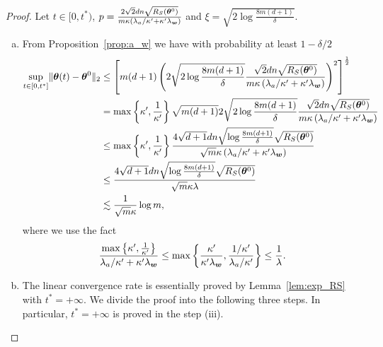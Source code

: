 \documentclass{article}
\begin{document}
\begin{proof}
    Let $t\in[0,t^*)$, $p=\frac{2\sqrt{2}dn\sqrt{R_S(\bm{\theta}^0)}}{m\kappa\left(\lambda_a/\kappa'+\kappa'\lambda_{\bm{w}}\right)}$ and $\xi=\sqrt{2\log\frac{8m(d+1)}{\delta}}$.
    \begin{enumerate}[(a)]
        \item From Proposition~\ref{prop:a_w} we have with probability at least $1-\delta/2$
              \begin{equation}
                  \begin{aligned}
                      \sup\limits_{t\in[0,t^*]}\lVert\bm{\theta}(t)-\bm{\theta}^0\rVert_2
                       & \leq \left[m(d+1)\left(2\sqrt{2\log\frac{8m(d+1)}{\delta}}\frac{\sqrt{2}dn\sqrt{R_S(\bm{\theta}^0)}}{m\kappa\left(\lambda_a/\kappa'+\kappa'\lambda_{\bm{w}}\right)}\right)^2\right]^{\frac{1}{2}}      \\
                       & =\max\left\{\kappa',\frac{1}{\kappa'}\right\}\sqrt{m(d+1)}2\sqrt{2\log\frac{8m(d+1)}{\delta}}\frac{\sqrt{2}dn\sqrt{R_S(\bm{\theta}^0)}}{m\kappa\left(\lambda_a/\kappa'+\kappa'\lambda_{\bm{w}}\right)} \\
                       & \leq\max\left\{\kappa',\frac{1}{\kappa'}\right\}\frac{4\sqrt{d+1}dn\sqrt{\log\frac{8m(d+1)}{\delta}}\sqrt{R_S(\bm{\theta}^0)}}{\sqrt{m}\kappa\left(\lambda_a/\kappa'+\kappa'\lambda_{\bm{w}}\right)}   \\
                       & \leq\frac{4\sqrt{d+1}dn\sqrt{\log\frac{8m(d+1)}{\delta}}\sqrt{R_S(\bm{\theta}^0)}}{\sqrt{m}\kappa\lambda}                                                                                           \\
                       & \lesssim \frac{1}{\sqrt{m}\kappa}\log m,
                  \end{aligned}
              \end{equation}
              where we use the fact
              \begin{equation}
                  \frac{\max\left\{\kappa',\frac{1}{\kappa'}\right\}}{\lambda_a/\kappa'+\kappa'\lambda_{\bm{w}}}\leq\max\left\{\frac{\kappa'}{\kappa'\lambda_{\bm{w}}},\frac{1/\kappa'}{\lambda_a/\kappa'}\right\}\leq\frac{1}{\lambda}.
              \end{equation}
        \item The linear convergence rate is essentially proved by Lemma~\ref{lem:exp_RS} with $t^* = +\infty$. We divide the proof into the following three steps. In particular, $t^*=+\infty$ is proved in the step (iii).
              \begin{enumerate}[(i)]

\end{enumerate}
\end{enumerate}
\end{proof}
\end{document}
